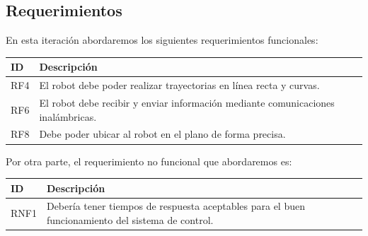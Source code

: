 \subsection{Requerimientos}

En esta iteración abordaremos los siguientes requerimientos funcionales:

\begin{center}
	\begin{tabular} {
    	| >{\centering\arraybackslash}m{1cm}
    	| >{\centering\arraybackslash}m{13cm} |}
    	\hline \rowcolor{test_header_color}
        	ID & Descripción \\
    	\hline
        	RF4 & El robot debe poder realizar trayectorias en línea recta y curvas. \\
    	\hline
        	RF6 & El robot debe recibir y enviar información mediante comunicaciones inalámbricas. \\
    	\hline
        	RF8 & Debe poder ubicar al robot en el plano de forma precisa. \\
    	\hline
	\end{tabular}
\end{center}

   Por otra parte, el requerimiento no funcional que abordaremos es:

\begin{center}
	\begin{tabular} {
    	| >{\centering\arraybackslash}m{1cm}
    	| >{\centering\arraybackslash}m{13cm} |}
    	\hline \rowcolor{test_header_color}
        	ID & Descripción \\
    	\hline
        	RNF1 & Debería tener tiempos de respuesta aceptables para el buen funcionamiento del sistema de control. \\
    	\hline
	\end{tabular}
\end{center}
